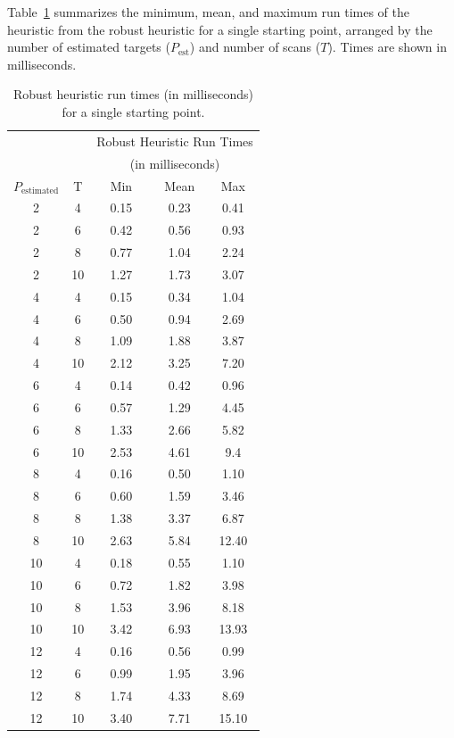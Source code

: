  Table~\ref{tab:Robust_heuristic_times} summarizes the minimum, mean, and maximum run times of the heuristic from the robust heuristic for a single starting point, arranged by the number of estimated targets ($P_{\text{est}}$) and number of scans ($T$). Times are shown in milliseconds. 
\begin{table}[ht]
\centering
\begin{tabular}{cc|ccc}
  \hline
   & & \multicolumn{3}{c}{Robust Heuristic Run Times} \\
   & & \multicolumn{3}{c}{(in milliseconds)}\\
   $ P_{\text{estimated}}$ & T & $\;\;$Min$\;\;$ & Mean & Max \\ 
  \hline
  \hline
  2 & 4 & 0.15 & 0.23 & 0.41 \\ 
  2 & 6 & 0.42 & 0.56 & 0.93 \\ 
  2 & 8 & 0.77 & 1.04 & 2.24 \\ 
  2 & 10 & 1.27 & 1.73 & 3.07 \\ 
  4 & 4 & 0.15 & 0.34 & 1.04 \\ 
  4 & 6 & 0.50 & 0.94 & 2.69 \\ 
  4 & 8 & 1.09 & 1.88 & 3.87 \\ 
  4 & 10 & 2.12 & 3.25 & 7.20 \\ 
  6 & 4 & 0.14 & 0.42 & 0.96 \\ 
  6 & 6 & 0.57 & 1.29 & 4.45 \\ 
  6 & 8 & 1.33 & 2.66 & 5.82 \\ 
  6 & 10 & 2.53 & 4.61 & 9.4 \\ 
  8 & 4 & 0.16 & 0.50 & 1.10 \\ 
  8 & 6 & 0.60 & 1.59 & 3.46 \\ 
  8 & 8 & 1.38 & 3.37 & 6.87 \\ 
  8 & 10 & 2.63 & 5.84 & 12.40 \\ 
  10 & 4 & 0.18 & 0.55 & 1.10 \\ 
  10 & 6 & 0.72 & 1.82 & 3.98 \\ 
  10 & 8 & 1.53 & 3.96 & 8.18 \\ 
  10 & 10 & 3.42 & 6.93 & 13.93 \\ 
  12 & 4 & 0.16 & 0.56 & 0.99 \\ 
  12 & 6 & 0.99 & 1.95 & 3.96 \\ 
  12 & 8 & 1.74 & 4.33 & 8.69 \\ 
  12 & 10 & 3.40 & 7.71 & 15.10 \\ 
   \hline
\end{tabular}
\caption{Robust heuristic run times (in milliseconds) for a single starting point.}
\label{tab:Robust_heuristic_times}
\end{table}

